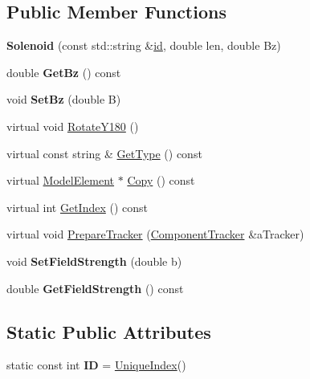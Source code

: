\subsection*{Public Member Functions}
\begin{DoxyCompactItemize}
\item 
\mbox{\label{classSolenoid_ab848889a2a16b6764459ba1ca5189713}} 
{\bfseries Solenoid} (const std\+::string \&\hyperlink{classModelElement_aada171ead2085c75b592cf07d91bc5c2}{id}, double len, double Bz)
\item 
\mbox{\label{classSolenoid_a87149bea2392a6b2e1e3930efa9efe6a}} 
double {\bfseries Get\+Bz} () const
\item 
\mbox{\label{classSolenoid_ad4c144cbf13969032da3ee3ff8db90af}} 
void {\bfseries Set\+Bz} (double B)
\item 
virtual void \hyperlink{classSolenoid_aff80a21647e92b9810f2058d9e8540b2}{Rotate\+Y180} ()
\item 
virtual const string \& \hyperlink{classSolenoid_ac120a84dc2b8e02ad747d818b3bf66af}{Get\+Type} () const
\item 
virtual \hyperlink{classModelElement}{Model\+Element} $\ast$ \hyperlink{classSolenoid_a712906ddbcacc761559736d01b04b513}{Copy} () const
\item 
virtual int \hyperlink{classSolenoid_a6aa64b57e6de710c77242d5e29a6ed8e}{Get\+Index} () const
\item 
virtual void \hyperlink{classSolenoid_a565c5334191f0c4b45b053144db29609}{Prepare\+Tracker} (\hyperlink{classComponentTracker}{Component\+Tracker} \&a\+Tracker)
\item 
\mbox{\label{classSolenoid_a28b987b0b11e955baeb1b2a85f2ae98d}} 
void {\bfseries Set\+Field\+Strength} (double b)
\item 
\mbox{\label{classSolenoid_a92494000a3e3a0bd3156504e512f944e}} 
double {\bfseries Get\+Field\+Strength} () const
\end{DoxyCompactItemize}
\subsection*{Static Public Attributes}
\begin{DoxyCompactItemize}
\item 
\mbox{\label{classSolenoid_aa19372aec63a055c08817847b02d83a4}} 
static const int {\bfseries ID} = \hyperlink{classAcceleratorComponent_aa7ad4d39e1a488b705983842ed1ac784}{Unique\+Index}()
\end{DoxyCompactItemize}
